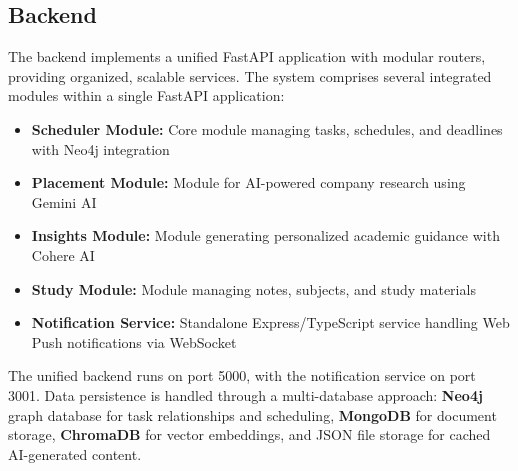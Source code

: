 \documentclass[conference]{IEEEtran}
\begin{document}
\subsection{Backend}
The backend implements a unified FastAPI application with modular routers, providing organized, scalable services. The system comprises several integrated modules within a single FastAPI application:
\begin{itemize}
    \item \textbf{Scheduler Module:} Core module managing tasks, schedules, and deadlines with Neo4j integration
    \item \textbf{Placement Module:} Module for AI-powered company research using Gemini AI
    \item \textbf{Insights Module:} Module generating personalized academic guidance with Cohere AI
    \item \textbf{Study Module:} Module managing notes, subjects, and study materials
    \item \textbf{Notification Service:} Standalone Express/TypeScript service handling Web Push notifications via WebSocket
\end{itemize}

The unified backend runs on port 5000, with the notification service on port 3001. Data persistence is handled through a multi-database approach: \textbf{Neo4j} graph database for task relationships and scheduling, \textbf{MongoDB} for document storage, \textbf{ChromaDB} for vector embeddings, and JSON file storage for cached AI-generated content.
\end{document}

